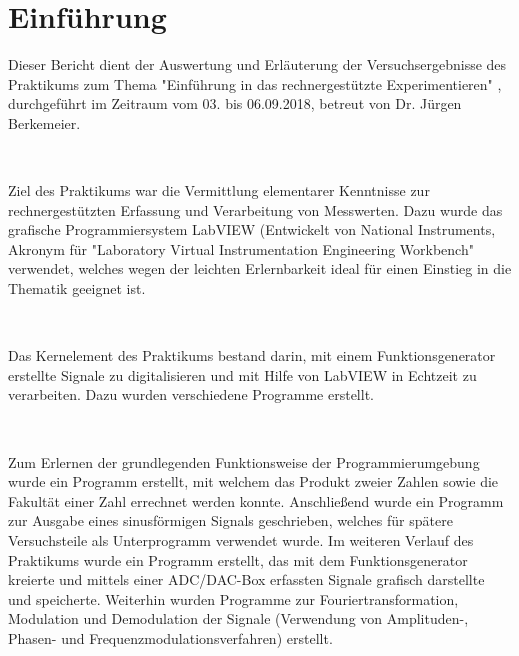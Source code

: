 \section{Einführung}

Dieser Bericht dient der Auswertung und Erläuterung der Versuchsergebnisse des Praktikums zum Thema  "Einführung in das rechnergestützte Experimentieren" , durchgeführt im Zeitraum vom 03. bis 06.09.2018, betreut von Dr. Jürgen Berkemeier.
	
\
	
Ziel des Praktikums war die Vermittlung elementarer Kenntnisse zur rechnergestützten Erfassung und Verarbeitung von Messwerten. Dazu wurde das grafische Programmiersystem LabVIEW (Entwickelt von National Instruments, Akronym für "Laboratory Virtual Instrumentation Engineering Workbench"\cite{LV} verwendet, welches wegen der leichten Erlernbarkeit ideal für einen Einstieg in die Thematik geeignet ist.

\

Das Kernelement des Praktikums bestand darin, mit einem Funktionsgenerator erstellte Signale zu digitalisieren und mit Hilfe von LabVIEW in Echtzeit zu verarbeiten. Dazu wurden verschiedene Programme erstellt.

\

Zum Erlernen der grundlegenden Funktionsweise der Programmierumgebung wurde ein Programm erstellt, mit welchem das Produkt zweier Zahlen sowie die Fakultät einer Zahl errechnet werden konnte. Anschließend wurde ein Programm zur Ausgabe eines sinusförmigen Signals geschrieben, welches für spätere Versuchsteile als Unterprogramm verwendet wurde. Im weiteren Verlauf des Praktikums wurde ein Programm erstellt, das mit dem Funktionsgenerator kreierte und mittels einer ADC/DAC-Box erfassten Signale grafisch darstellte und speicherte. Weiterhin wurden Programme zur Fouriertransformation, Modulation und Demodulation der Signale (Verwendung von Amplituden-, Phasen- und Frequenzmodulationsverfahren) erstellt.
